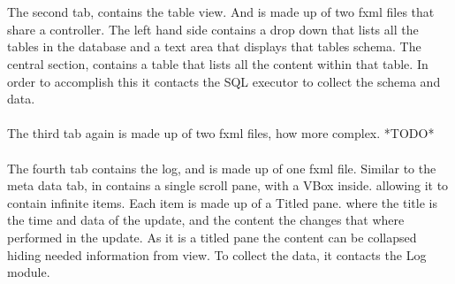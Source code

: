 \\\\
The second tab, contains the table view. And is made up of two fxml files that share a controller. The left hand side contains a drop down that lists all the tables in the database and a text area that displays that tables schema. The central section, contains a table that lists all the content within that table. In order to accomplish this it contacts the SQL executor to collect the schema and data.  
\\\\
The third tab again is made up of two fxml files, how more complex. *TODO*
\\\\
The fourth tab contains the log, and is made up of one fxml file. Similar to the meta data tab, in contains a single scroll pane, with a VBox inside. allowing it to contain infinite items. Each item is made up of a Titled pane. where the title is the time and data of the update, and the content the changes that where performed in the update. As it is a titled pane the content can be collapsed hiding needed information from view. To collect the data, it contacts the Log module.